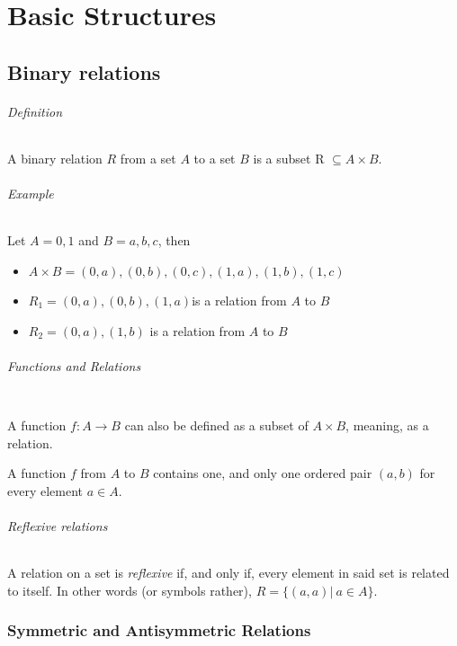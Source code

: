 \documentclass[10pt,a4paper]{book}
\begin{document}
\part{Basic Structures}

\chapter{Binary relations}

\paragraph*{Definition}
A binary relation $R$ from a set $A$ to a set $B$ is a subset R $\subseteq A \times B$.

\paragraph*{Example}
Let $A = {0,1}$ and $B = {a,b,c}$, then
\begin{itemize}
\item $A \times B ={(0, a),(0, b),(0, c),(1, a), (1, b), (1, c)}$
\item $R_1 ={(0, a), (0, b), (1, a)}$is a relation from $A$ to $B$
\item $R_2 ={(0, a), (1,b)}$ is a relation from $A$ to $B$
\end{itemize}

\paragraph*{Functions and Relations}
$\ $\par 
A function $f:A \to B$ can also be defined as a subset of $A \times B$, meaning, as a relation.\par
A function $f$ from $A$ to $B$ contains one, and only one ordered pair $(a,b)$ for every element $a \in A$.

\paragraph*{Reflexive relations}
A relation on a set is \textit{reflexive} if, and only if, every element in said set is related to itself. In other words (or symbols rather), $R = \{(a,a)|\ a\in A\}$.

\section{Symmetric and Antisymmetric Relations}
\end{document}
